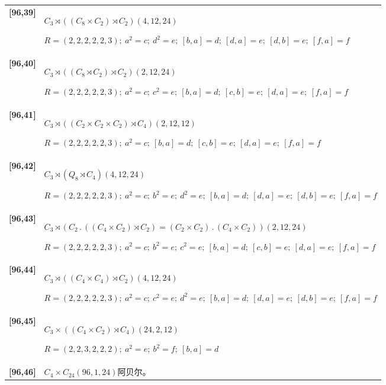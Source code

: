\documentclass[UTF8,fontset=fandol,11pt,a4paper]{ctexart}
\begin{document}
\begin{longtable}{@{}p{17mm}>{\raggedright\arraybackslash}p{141mm}@{}}
\textbf{[96,39]} & $C_{3}\rtimes ((C_{8}\times C_{2})\rtimes C_{2})$\quad $(4,12,24)$\par\(R=(2,2,2,2,2,3);\allowbreak\ a^{2}=c;\allowbreak\ d^{2}=e;\allowbreak\ [b,a]=d;\allowbreak\ [d,a]=e;\allowbreak\ [d,b]=e;\allowbreak\ [f,a]=f\)\\[3pt]

\textbf{[96,40]} & $C_{3}\rtimes ((C_{8}\rtimes C_{2})\rtimes C_{2})$\quad $(2,12,24)$\par\(R=(2,2,2,2,2,3);\allowbreak\ a^{2}=c;\allowbreak\ c^{2}=e;\allowbreak\ [b,a]=d;\allowbreak\ [c,b]=e;\allowbreak\ [d,a]=e;\allowbreak\ [f,a]=f\)\\[3pt]

\textbf{[96,41]} & $C_{3}\rtimes ((C_{2}\times C_{2}\times C_{2})\rtimes C_{4})$\quad $(2,12,12)$\par\(R=(2,2,2,2,2,3);\allowbreak\ a^{2}=c;\allowbreak\ [b,a]=d;\allowbreak\ [c,b]=e;\allowbreak\ [d,a]=e;\allowbreak\ [f,a]=f\)\\[3pt]

\textbf{[96,42]} & $C_{3}\rtimes (Q_{8}\rtimes C_{4})$\quad $(4,12,24)$\par\(R=(2,2,2,2,2,3);\allowbreak\ a^{2}=c;\allowbreak\ b^{2}=e;\allowbreak\ d^{2}=e;\allowbreak\ [b,a]=d;\allowbreak\ [d,a]=e;\allowbreak\ [d,b]=e;\allowbreak\ [f,a]=f\)\\[3pt]

\textbf{[96,43]} & $C_{3}\rtimes (C_{2}\mathbin{.} ((C_{4}\times C_{2})\rtimes C_{2}) = (C_{2}\times C_{2})\mathbin{.} (C_{4}\times C_{2}))$\quad $(2,12,24)$\par\(R=(2,2,2,2,2,3);\allowbreak\ a^{2}=c;\allowbreak\ b^{2}=e;\allowbreak\ c^{2}=e;\allowbreak\ [b,a]=d;\allowbreak\ [c,b]=e;\allowbreak\ [d,a]=e;\allowbreak\ [f,a]=f\)\\[3pt]

\textbf{[96,44]} & $C_{3}\rtimes ((C_{4}\times C_{4})\rtimes C_{2})$\quad $(4,12,24)$\par\(R=(2,2,2,2,2,3);\allowbreak\ a^{2}=c;\allowbreak\ c^{2}=e;\allowbreak\ d^{2}=e;\allowbreak\ [b,a]=d;\allowbreak\ [d,a]=e;\allowbreak\ [d,b]=e;\allowbreak\ [f,a]=f\)\\[3pt]

\textbf{[96,45]} & $C_{3}\times ((C_{4}\times C_{2})\rtimes C_{4})$\quad $(24,2,12)$\par\(R=(2,2,3,2,2,2);\allowbreak\ a^{2}=e;\allowbreak\ b^{2}=f;\allowbreak\ [b,a]=d\)\\[3pt]

\textbf{[96,46]} & $C_{4}\times C_{24}$\quad $(96,1,24)$\quad 阿贝尔。\\[3pt]


\end{longtable}
\end{document}
